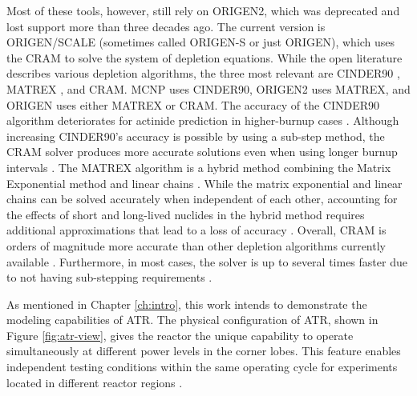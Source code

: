 Most of these tools, however, still rely on ORIGEN2, which was deprecated and lost support more than three decades ago.
The current version is ORIGEN/SCALE (sometimes called ORIGEN-S or just ORIGEN), which uses the \gls*{CRAM} \cite{cram} to solve the system of depletion equations.
While the open literature describes various depletion algorithms, the three most relevant are CINDER90 \cite{mcnp-cinder}, MATREX \cite{scale}, and \gls*{CRAM}.
MCNP uses CINDER90, ORIGEN2 uses MATREX, and ORIGEN uses either MATREX or CRAM.
The accuracy of the CINDER90 algorithm deteriorates for actinide prediction in higher-burnup cases \cite{mcnp-cinder}.
Although increasing CINDER90’s accuracy is possible by using a sub-step method, the CRAM solver produces more accurate solutions even when using longer burnup intervals \cite{vera}.
The MATREX algorithm is a hybrid method combining the Matrix Exponential method and linear chains \cite{origen2}.
While the matrix exponential and linear chains can be solved accurately when independent of each other, accounting for the effects of short and long-lived nuclides in the hybrid method requires additional approximations that lead to a loss of accuracy \cite{origen-cram}.
Overall, CRAM is orders of magnitude more accurate than other depletion algorithms currently available \cite{vera, origen2, origen-cram}.
Furthermore, in most cases, the solver is up to several times faster due to not having sub-stepping requirements \cite{origen-cram}.

As mentioned in Chapter \ref{ch:intro}, this work intends to demonstrate the modeling capabilities of ATR.
The physical configuration of ATR, shown in Figure \ref{fig:atr-view}, gives the reactor the unique capability to operate simultaneously at different power levels in the corner lobes.
This feature enables independent testing conditions within the same operating cycle for experiments located in different reactor regions \cite{atr}.

